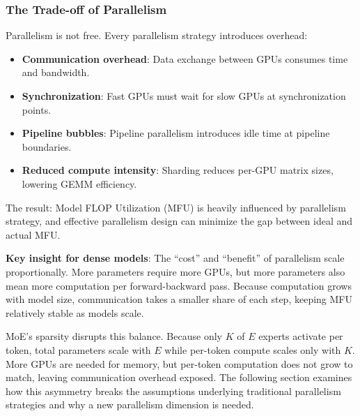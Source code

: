 \subsubsection{The Trade-off of Parallelism}

Parallelism is not free. Every parallelism strategy introduces overhead:

\begin{itemize}
    \item \textbf{Communication overhead}: Data exchange between GPUs consumes time and bandwidth.
    \item \textbf{Synchronization}: Fast GPUs must wait for slow GPUs at synchronization points.
    \item \textbf{Pipeline bubbles}: Pipeline parallelism introduces idle time at pipeline boundaries.
    \item \textbf{Reduced compute intensity}: Sharding reduces per-GPU matrix sizes, lowering GEMM efficiency.
\end{itemize}

The result: Model FLOP Utilization (MFU) is heavily influenced by parallelism strategy, and effective parallelism design can minimize the gap between ideal and actual MFU.

\textbf{Key insight for dense models}: The ``cost'' and ``benefit'' of parallelism scale proportionally. More parameters require more GPUs, but more parameters also mean more computation per forward-backward pass. Because computation grows with model size, communication takes a smaller share of each step, keeping MFU relatively stable as models scale.

MoE's sparsity disrupts this balance. Because only $K$ of $E$ experts activate per token, total parameters scale with $E$ while per-token compute scales only with $K$. More GPUs are needed for memory, but per-token computation does not grow to match, leaving communication overhead exposed. The following section examines how this asymmetry breaks the assumptions underlying traditional parallelism strategies and why a new parallelism dimension is needed.

